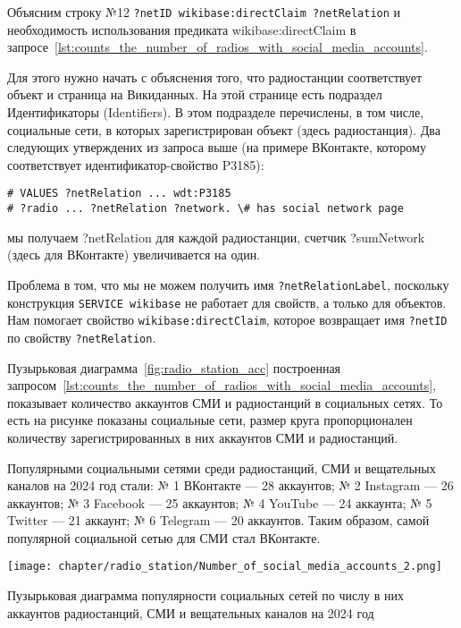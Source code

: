 
Объясним строку №12 \lstinline|?netID wikibase:directClaim ?netRelation| и необходимость использования предиката wikibase:directClaim в запросе~\ref{lst:counts_the_number_of_radios_with_social_media_accounts}.

Для этого нужно начать с объяснения того, что радиостанции соответствует объект и страница на Викиданных. На этой странице есть подраздел Идентификаторы (Identifiers). В этом подразделе перечислены, в том числе, социальные сети, в которых зарегистрирован объект (здесь радиостанция). Два следующих утверждених из запроса выше (на примере ВКонтакте, которому соответствует идентификатор-свойство P3185):

\begin{lstlisting}
# VALUES ?netRelation ... wdt:P3185
# ?radio ... ?netRelation ?network. \# has social network page
\end{lstlisting}

мы получаем ?netRelation для каждой радиостанции, счетчик ?sumNetwork (здесь для ВКонтакте) увеличивается на один.

Проблема в том, что мы не можем получить имя \lstinline|?netRelationLabel|, поскольку конструкция \lstinline|SERVICE wikibase| не работает для свойств, а только для объектов. Нам помогает свойство \lstinline|wikibase:directClaim|, которое возвращает имя \lstinline|?netID| по свойству \lstinline|?netRelation|.

\newpage

Пузырьковая диаграмма~\ref{fig:radio_station_acc} построенная запросом~\ref{lst:counts_the_number_of_radios_with_social_media_accounts}, показывает количество аккаунтов СМИ и радиостанций в социальных сетях. То есть на рисунке показаны социальные сети, размер круга пропорционален количеству зарегистрированных в них аккаунтов СМИ и радиостанций.

Популярными социальными сетями среди радиостанций, СМИ и вещательных каналов на 2024 год стали: № 1 ВКонтакте — 28 аккаунтов; № 2 Instagram — 26 аккаунтов; № 3 Facebook — 25 аккаунтов; № 4 YouTube — 24 аккаунта; № 5 Twitter — 21 аккаунт; № 6 Telegram — 20 аккаунтов. Таким образом, самой популярной социальной сетью для СМИ стал ВКонтакте.

\begin{marginfigure}[1\baselineskip]
{\texttt{[image: chapter/radio\_station/Number\_of\_social\_media\_accounts\_2.png]}}
\vspace{-7pt}
\caption{Пузырьковая диаграмма популярности социальных сетей по числу в них аккаунтов радиостанций, СМИ и вещательных каналов на 2024 год}%
\label{fig:radio_station_acc}
\end{marginfigure}

%
